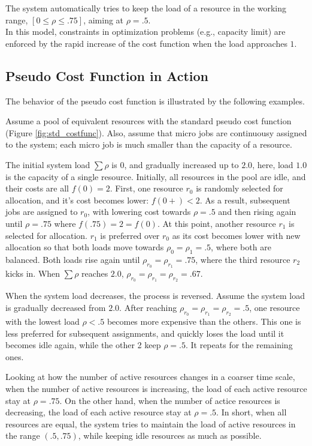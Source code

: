The system automatically tries to keep the load of a resource in the
working range, $[0 \le \rho \le .75]$, aiming at $\rho = .5$. \\

In this model, constraints in optimization problems (e.g.,
capacity limit) are enforced by the rapid increase of the cost function when
the load approaches $1$. 

\subsection{Pseudo Cost Function in Action}

The behavior of the pseudo cost function is illustrated by the
following examples.

Assume a pool of equivalent resources with the standard pseudo cost
function (Figure \ref{fig:std_costfunc}).
Also, assume that micro jobs are continuousy assigned to the
system; each micro job is much smaller than the capacity of a
resource.

The initial system load $\sum \rho$ is $0$, and gradually increased
up to $2.0$, here, load $1.0$ is the capacity of a single resource.
Initially, all resources in the pool are idle, and their costs are
all $f(0)= 2$.
First, one resource $r_{0}$ is randomly selected for allocation, and it's
cost becomes lower: $f(0+) < 2$. As a result, subsequent jobs are
assigned to $r_{0}$, with lowering cost towards $\rho = .5$ and then
rising again until $\rho = .75$ where $f(.75) = 2 = f(0)$.
At this point, another resource $r_{1}$ is selected for allocation.
$r_{1}$ is preferred over $r_{0}$ as its cost becomes lower with new
allocation so that both loads move towards $\rho_{0} = \rho_{1} = .5$,
where both are balanced.
Both loads rise again until $\rho_{r_{0}} = \rho_{r_{1}} = .75$,
where the third resource $r_{2}$ kicks in.
When $\sum \rho$ reaches $2.0$, $\rho_{r_{0}} = \rho_{r_{1}} = \rho_{r_{2}} = .67$.

When the system load decreases, the process is reversed.
Assume the system load is gradually decreased from $2.0$.
After reaching $\rho_{r_{0}} = \rho_{r_{1}} = \rho_{r_{2}} = .5$,
one resource with the lowest load $\rho < .5$ becomes more expensive
than the others.
This one is less preferred for subsequent assignments, and quickly
loses the load until it becomes idle again, while the other 2 keep
$\rho = .5$. It repeats for the remaining ones.

Looking at how the number of active resources changes in a coarser
time scale,
when the number of active resources is increasing, the load of each
active resource stay at $\rho = .75$.
On the other hand, when the number of actice resources is decreasing,
the load of each active resource stay at $\rho = .5$.
In short, when all resources are equal, the system tries to maintain
the load of active resources in the range $(.5, .75)$, while keeping
idle resources as much as possible.

